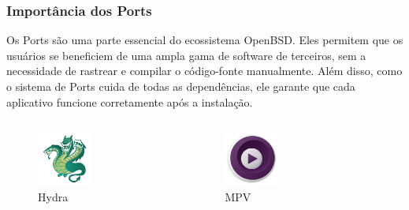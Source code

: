 \documentclass[9pt,xcolor=table]{beamer}
\begin{document}
\begin{frame}
\frametitle{Importância dos Ports}
\justifying
Os Ports são uma parte essencial do ecossistema OpenBSD. Eles permitem que os usuários se beneficiem de uma ampla gama de software de terceiros, sem a necessidade de rastrear e compilar o código-fonte manualmente. Além disso, como o sistema de Ports cuida de todas as dependências, ele garante que cada aplicativo funcione corretamente após a instalação.
\vspace{0.5cm}
\begin{columns}
\begin{column}{0.3\textwidth}
\begin{figure}
\centering
\includegraphics[width=0.5\textwidth]{imagens/hydra-logo.png}
\caption{Hydra}
\end{figure}
\end{column}
\begin{column}{0.3\textwidth}
\begin{figure}
\centering
\includegraphics[width=0.5\textwidth]{imagens/mpv-logo.png}
\caption{MPV}
\end{figure}
\end{column}
\begin{column}{0.3\textwidth}
\begin{figure}

\end{figure}
\end{column}
\end{columns}
\end{frame}
\end{document}
